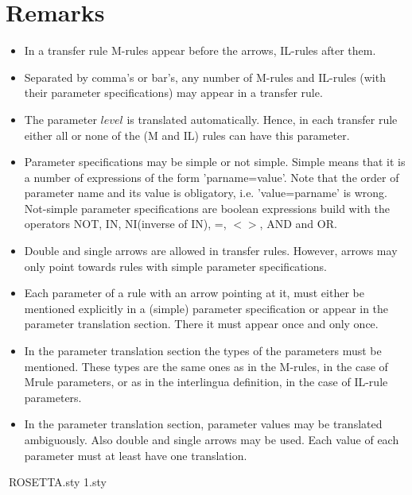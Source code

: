 \section{Remarks}
\begin{itemize}
\item In a transfer rule M-rules appear before the arrows, IL-rules after them.
\item Separated by comma's or bar's, any number of M-rules and IL-rules
      (with their parameter specifications) may appear in a transfer rule.
\item The parameter $level$ is translated automatically. Hence, in each
      transfer rule either all or none of the (M and IL) rules can have this
      parameter.
\item Parameter specifications may be simple or not simple. Simple means
      that it is a number of expressions of the form 'parname=value'. Note
      that the order of parameter name and its value is obligatory,
      i.e. 'value=parname' is wrong.
      Not-simple parameter specifications are boolean expressions build
      with the operators NOT, IN, NI(inverse of IN), =, $<>$, AND and OR.
\item Double and single arrows are allowed in transfer rules. However,
      arrows may only point towards rules with simple parameter specifications.
\item Each parameter of a rule with an arrow pointing at it, must either be
      mentioned explicitly in a (simple) parameter specification or appear
      in the parameter translation section. There it must appear once and only
      once.
\item In the parameter translation section the types of the parameters must
      be mentioned. These types are the same ones as in the M-rules, in the
      case of Mrule parameters, or as in the interlingua definition, in the
      case of IL-rule parameters.
\item In the parameter translation section, parameter values may be translated
      ambiguously. Also double and single arrows may be used. Each
      value of each parameter must at least have one translation.
\end{itemize}




ROSETTA.sty
\def\@ptsize{1}
\@namedef{ds@10pt}{\def\@ptsize{0}}
\@namedef{ds@12pt}{\def\@ptsize{2}}
\@twosidetrue
\@mparswitchtrue
\def\ds@draft{\overfullrule 5pt}
\@options
\@ptsize.sty\relax



